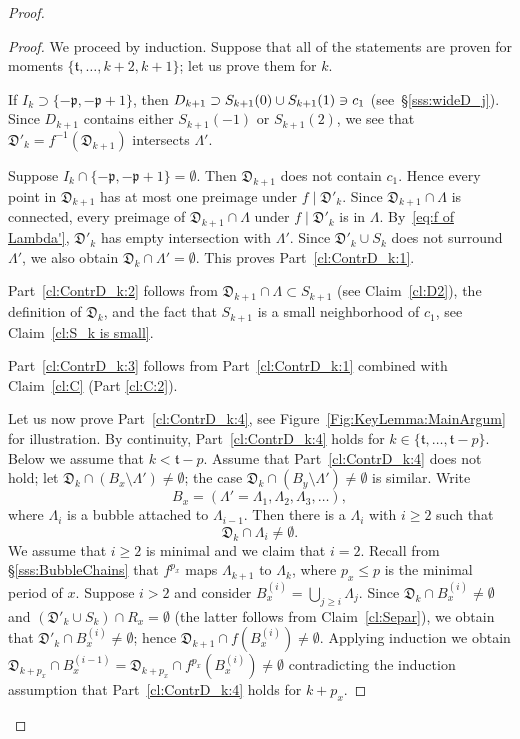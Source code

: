 \documentclass[]{amsart}
\newcommand{\bLambda}{{\mathbb{\Lambda}}}
\newcommand{\pp}{\mathfrak{p}}
\renewcommand{\tt}{\mathfrak{t}}
\theoremstyle{remark}
\numberwithin{equation}{section}
\theoremstyle{definition}
\begin{document}
\begin{proof}
\begin{proof}
We proceed by induction. Suppose that all of the statements are proven for moments $\{\tt, \dots, k+2,k+1\}$; let us prove them for $k$.

If $I_k\supset \{-\pp,-\pp+1\}$, then $\mathfrak \mathfrak D_{k+1}\supset S_{k+1}(0)\cup S_{k+1}(1)\ni c_1$ (see~\S\ref{sss:wideD_j}). Since  $D_{k+1}$ contains either $S_{k+1}(-1)$ or $ S_{k+1}(2)$, we see that $\mathfrak D'_{k}=f^{-1}(\mathfrak D_{k+1})$ intersects $\bLambda'$. 

Suppose $I_k\cap  \{-\pp,-\pp+1\}= \emptyset$. Then $ \mathfrak D_{k+1}$ does not contain $c_1$. Hence every point in $ \mathfrak D_{k+1}$ has at most one preimage under $f\mid \mathfrak D'_k$. Since $\mathfrak D_{k+1}\cap \bLambda$ is connected, every preimage of $\mathfrak D_{k+1}\cap \bLambda$ under $f\mid \mathfrak D'_k$ is in $\bLambda$. By~\eqref{eq:f of Lambda'}, $\mathfrak D'_k$ has empty intersection with $\bLambda'$. Since $\mathfrak D'_k\cup S_k$ does not surround $\bLambda'$, we also obtain $\mathfrak D_k\cap \bLambda'=\emptyset$. This proves Part~\eqref{cl:ContrD_k:1}.




 Part~\eqref{cl:ContrD_k:2} follows from $\mathfrak D_{k+1}\cap \bLambda\subset S_{k+1}$ (see Claim~\ref{cl:D2}), the definition of $\mathfrak D_{k}$, and the fact that $S_{k+1}$ is a small neighborhood of $c_1$, see Claim~\ref{cl:S_k is small}. 
 
 Part~\eqref{cl:ContrD_k:3} follows from Part~\eqref{cl:ContrD_k:1} combined with Claim~\ref{cl:C} (Part \eqref{cl:C:2}).


Let us now prove Part~\eqref{cl:ContrD_k:4}, see Figure~\ref{Fig:KeyLemma:MainArgum} for illustration. By continuity, Part~\eqref{cl:ContrD_k:4} holds for $k\in \{\tt,\dots, \tt-p\}$. Below we assume that $k<\tt-p$. Assume that Part~\eqref{cl:ContrD_k:4} does not hold; let $\mathfrak D_k\cap (B_x\setminus \Lambda')\not=\emptyset$; the case $\mathfrak D_k\cap (B_y\setminus \Lambda')\not=\emptyset$ is similar. Write \[B_x=(\bLambda'=\bLambda_1, \bLambda_2,\bLambda_3,\dots),\]
where $\bLambda_i$ is a bubble attached to $\bLambda_{i-1}$. Then there is a $\bLambda_i$  with $i\ge 2$ such that 
\[ \mathfrak D_k \cap \bLambda_i\not=\emptyset.\]
We assume that $i\ge 2$ is minimal and we claim that $i=2$. Recall from \S\ref{sss:BubbleChains} that $f^{p_x}$ maps $\Lambda_{k+1}$ to $\Lambda_k$, where $p_x\le p$ is the minimal period of $x$. Suppose $i>2$ and consider $B_x^{(i)}=\bigcup_{j\ge i} \bLambda_j$. Since $\mathfrak D_k\cap B_x^{(i)}\not=\emptyset$ and $(\mathfrak D'_k\cup S_k)\cap R_x=\emptyset$ (the latter follows from Claim~\ref{cl:Separ}), we obtain that $\mathfrak D'_k\cap B_x^{(i)}\not=\emptyset$; hence $\mathfrak D_{k+1}\cap f(B_x^{(i)})\not=\emptyset$. Applying induction we obtain $\mathfrak D_{k+p_x}\cap B_x^{(i-1)}=\mathfrak D_{k+p_x}\cap f^{p_x}(B_x^{(i)})\not=\emptyset$ contradicting the induction assumption that Part~\eqref{cl:ContrD_k:4} holds for $k+p_x$.



\end{proof}
\end{proof}
\end{document}
